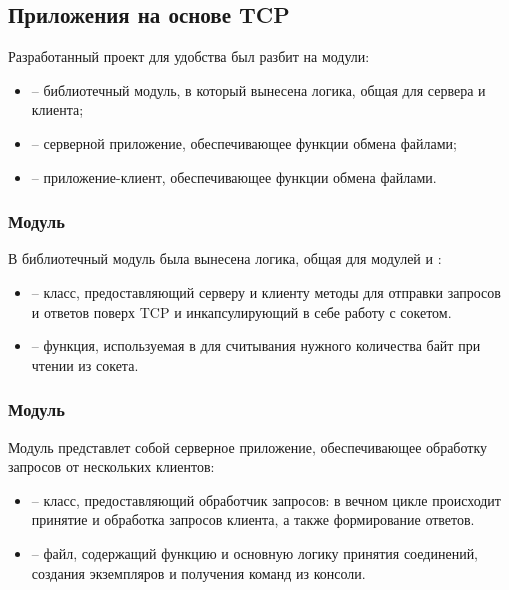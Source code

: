 \subsection{Приложения на основе TCP}

Разработанный проект  для удобства был разбит на модули:
\begin{itemize}
	\item {} -- библиотечный модуль, в который вынесена логика, общая для сервера и клиента;
	\item {} -- серверной приложение, обеспечивающее функции обмена файлами;
	\item {} -- приложение-клиент, обеспечивающее функции обмена файлами.
\end{itemize}

\subsubsection{Модуль }

В библиотечный модуль  была вынесена логика, общая для модулей  и :
\begin{itemize}
	\item {} -- класс, предоставляющий серверу и клиенту методы для отправки запросов и ответов поверх TCP и инкапсулирующий в себе работу с сокетом.
	\item {} -- функция, используемая в  для считывания нужного количества байт при чтении из сокета.

\end{itemize}

\subsubsection{Модуль }

Модуль  представлет собой серверное приложение, обеспечивающее обработку запросов от нескольких клиентов:
\begin{itemize}
	\item {} -- класс, предоставляющий обработчик запросов: в вечном цикле происходит принятие и обработка запросов клиента, а также формирование ответов.
	\item {} -- файл, содержащий функцию  и основную логику принятия соединений, создания экземпляров  и получения команд из консоли.
\end{itemize}

